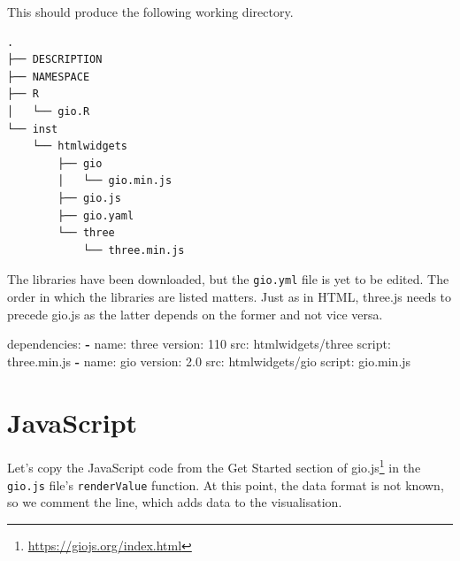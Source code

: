 \documentclass[10pt,]{krantz}
\makeatletter
\newenvironment{Shaded}{\begin{snugshade}}{\end{snugshade}}
\newcommand{\AttributeTok}[1]{\textcolor[rgb]{0.61,0.61,0.61}{#1}}
\newcommand{\DecValTok}[1]{\textcolor[rgb]{0.06,0.06,0.06}{#1}}
\newcommand{\FloatTok}[1]{\textcolor[rgb]{0.06,0.06,0.06}{#1}}
\newcommand{\FunctionTok}[1]{\textcolor[rgb]{0,0,0}{#1}}
\newcommand{\KeywordTok}[1]{\textcolor[rgb]{0.27,0.27,0.27}{\textbf{#1}}}
\renewcommand{\href}[2]{#2\footnote{\url{#1}}}
\newenvironment{kframe}{%
\medskip{}
\setlength{\fboxsep}{.8em}
 \def\at@end@of@kframe{}%
 \ifinner\ifhmode%
  \def\at@end@of@kframe{\end{minipage}}%
  \begin{minipage}{\columnwidth}%
 \fi\fi%
 \def\FrameCommand##1{\hskip\@totalleftmargin \hskip-\fboxsep
 \colorbox{shadecolor}{##1}\hskip-\fboxsep
     \hskip-\linewidth \hskip-\@totalleftmargin \hskip\columnwidth}%
 \MakeFramed {\advance\hsize-\width
   \@totalleftmargin\z@ \linewidth\hsize
   \@setminipage}}%
 {\par\unskip\endMakeFramed%
 \at@end@of@kframe}
\renewenvironment{Shaded}{\begin{kframe}}{\end{kframe}}
\makeatother
\begin{document}
This should produce the following working directory.

\begin{verbatim}
.
├── DESCRIPTION
├── NAMESPACE
├── R
│   └── gio.R
└── inst
    └── htmlwidgets
        ├── gio
        │   └── gio.min.js
        ├── gio.js
        ├── gio.yaml
        └── three
            └── three.min.js
\end{verbatim}

The libraries have been downloaded, but the \texttt{gio.yml} file is yet to be edited. The order in which the libraries are listed matters. Just as in HTML, three.js needs to precede gio.js as the latter depends on the former and not vice versa.

\begin{Shaded}
\begin{Highlighting}[]
\FunctionTok{dependencies:}
  \KeywordTok{-} \FunctionTok{name:}\AttributeTok{ three}
    \FunctionTok{version:}\AttributeTok{ }\DecValTok{110}
    \FunctionTok{src:}\AttributeTok{ htmlwidgets/three}
    \FunctionTok{script:}\AttributeTok{ three.min.js}
  \KeywordTok{-} \FunctionTok{name:}\AttributeTok{ gio}
    \FunctionTok{version:}\AttributeTok{ }\FloatTok{2.0}
    \FunctionTok{src:}\AttributeTok{ htmlwidgets/gio}
    \FunctionTok{script:}\AttributeTok{ gio.min.js}
\end{Highlighting}
\end{Shaded}

\hypertarget{widgets-full-js}{%
\section{JavaScript}\label{widgets-full-js}}

Let's copy the JavaScript code from the \href{https://giojs.org/index.html}{Get Started section of gio.js} in the \texttt{gio.js} file's \texttt{renderValue} function. At this point, the data format is not known, so we comment the line, which adds data to the visualisation.
\end{document}
